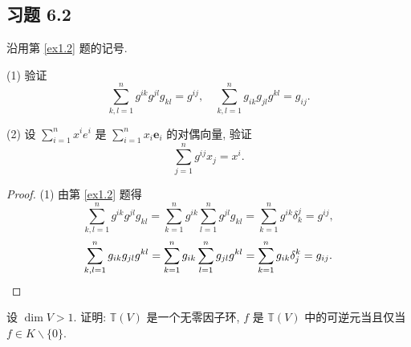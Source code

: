 \documentclass[color=black,device=normal,lang=cn,mode=geye]{elegantnote}
\begin{document}
\subsection{习题 6.2}
\begin{exercise}%
    沿用第 \ref{ex1.2} 题的记号.

    (1) 验证
    \[\sum\limits_{k,l=1}^ng^{ik}g^{jl}g_{kl}=g^{ij},\quad\sum\limits_{k,l=1}^ng_{ik}g_{jl}g^{kl}=g_{ij}.\]

    (2) 设 $\sum\limits_{i=1}^nx^ie^i$ 是 $\sum\limits_{i=1}^nx_i\boldsymbol{e}_i$ 的对偶向量, 验证
    \[\sum\limits_{j=1}^ng^{ij}x_j=x^i.\]
\end{exercise}
\begin{proof}
    (1) 由第 \ref{ex1.2} 题得
    \[\sum\limits_{k,l=1}^ng^{ik}g^{jl}g_{kl}=\sum\limits_{k=1}^ng^{ik}\sum\limits_{l=1}^ng^{jl}g_{kl}=\sum\limits_{k=1}^ng^{ik}\delta^j_k=g^{ij},\]
    \[\sum\limits_{k,l=1}^ng_{ik}g_{jl}g^{kl}=\sum\limits_{k=1}^ng_{ik}\sum\limits_{l=1}^ng_{jl}g^{kl}=\sum\limits_{k=1}^ng_{ik}\delta_j^k=g_{ij}.\qedhere\]
\end{proof}
\begin{exercise}\label{ex2.2}
    设 $\dim V>1$. 证明: $\mathbb{T}(V)$ 是一个无零因子环, $f$ 是 $\mathbb{T}(V)$ 中的可逆元当且仅当 $f\in K\backslash\{0\}$.
\end{exercise}
\end{document}
